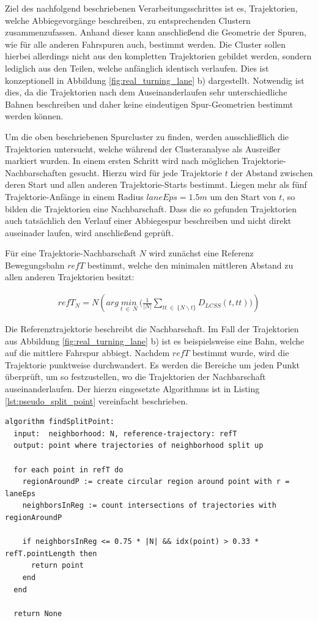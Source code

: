Ziel des nachfolgend beschriebenen Verarbeitungsschrittes ist es, Trajektorien, welche Abbiegevorgänge
beschreiben, zu entsprechenden Clustern zusammenzufassen. Anhand dieser kann anschließend die Geometrie
der Spuren, wie für alle anderen Fahrspuren auch, bestimmt werden.
Die Cluster sollen hierbei allerdings nicht aus den kompletten Trajektorien gebildet werden, sondern
lediglich aus den Teilen, welche anfänglich identisch verlaufen. Dies ist konzeptionell in Abbildung
\ref{fig:real_turning_lane} b) dargestellt. Notwendig ist dies, da die Trajektorien nach dem Auseinanderlaufen
sehr unterschiedliche Bahnen beschreiben und daher keine eindeutigen Spur-Geometrien bestimmt werden können.

Um die oben beschriebenen Spurcluster zu finden, werden ausschließlich die Trajektorien untersucht,
welche während der Clusteranalyse als Ausreißer markiert wurden.
In einem ersten Schritt wird nach möglichen Trajektorie-Nachbarschaften gesucht. Hierzu wird für
jede Trajektorie $t$ der Abstand zwischen deren Start und allen anderen Trajektorie-Starts bestimmt.
Liegen mehr als fünf Trajektorie-Anfänge in einem Radius $laneEps = 1.5m$ um den Start von $t$, so bilden
die Trajektorien eine Nachbarschaft.
Dass die so gefunden Trajektorien auch tatsächlich den Verlauf einer Abbiegespur beschreiben und nicht
direkt auseinader laufen, wird anschließend geprüft.

Für eine Trajektorie-Nachbarschaft $N$ wird zunächst eine Referenz Bewegungsbahn $refT$ bestimmt, welche den
minimalen mittleren Abstand zu allen anderen Trajektorien besitzt:

\begin{ceqn}
\begin{align}
    refT_N = N(arg\ \underset{t\ \in\ N}{min}\ \Big(\frac{1}{|N|} \sum_{tt\ \in\ \{N \backslash t\}} D_{LCSS}(t, tt) \Big))
\end{align}
\end{ceqn}

Die Referenztrajektorie beschreibt die Nachbarschaft. Im Fall der Trajektorien aus Abbildung
\ref{fig:real_turning_lane} b) ist es beispielsweise eine Bahn, welche auf die mittlere Fahrspur abbiegt.
Nachdem $refT$ bestimmt wurde, wird die Trajektorie punktweise durchwandert. Es werden die Bereiche um jeden
Punkt überprüft, um so festzustellen, wo die Trajektorien der Nachbarschaft auseinanderlaufen. Der hierzu
eingesetzte Algorithmus ist in Listing \ref{lst:pseudo_split_point} vereinfacht beschrieben.
\begin{lstlisting}[caption=Pseudocode Split-Punkt Bestimmung, language=Pseudo, label=lst:pseudo_split_point]
algorithm findSplitPoint:
  input:  neighborhood: N, reference-trajectory: refT
  output: point where trajectories of neighborhood split up

  for each point in refT do
    regionAroundP := create circular region around point with r = laneEps
    neighborsInReg := count intersections of trajectories with regionAroundP

    if neighborsInReg <= 0.75 * |N| && idx(point) > 0.33 * refT.pointLength then
      return point
    end
  end

  return None
\end{lstlisting}

